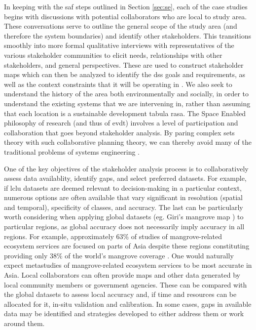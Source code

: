 \documentclass[notitlepage]{article}
\begin{document}
In keeping with the \ac{saf} steps outlined in Section \ref{sec:se}, each of the case studies begins with discussions with potential collaborators who are local to study area. These conversations serve to outline the general scope of the study area (and therefore the system boundaries) and identify other stakeholders. This transitions smoothly into more formal qualitative interviews with representatives of the various stakeholder communities to elicit needs, relationships with other stakeholders, and general perspectives. These are used to construct stakeholder maps which can then be analyzed to identify the \ac{dss} goals and requirements, as well as the context constraints that it will be operating in \cite{crawleySystemArchitectureStrategy2015, woodBuildingTechnologicalCapability2012}. We also seek to understand the history of the area both environmentally and socially, in order to understand the existing systems that we are intervening in, rather than assuming that each location is a sustainable development tabula rasa. The Space Enabled philosophy of research (and thus of \ac{evdt}) involves a level of participation and collaboration that goes beyond stakeholder analysis. By paring complex \ac{sets} theory with such collaborative planning theory, we can thereby avoid many of the traditional problems of systems engineering \cite{goodspeedScenarioPlanningCities2020}. 

\color{OliveGreen}

One of the key objectives of the stakeholder analysis process is to collaboratively assess data availablity, identify gaps, and select preferred datasets. For example, if \ac{lclu} datasets are deemed relevant to decision-making in a particular context, numerous options are often available that vary significant in resolution (spatial and temporal), specificity of classes, and accuracy. The last can be particularly worth considering when applying global datasets (eg. Giri's mangrove map \cite{giriStatusDistributionMangrove2011}) to particular regions, as global accuracy does not necessarily imply accuracy in all regions. For example, approximately 63\% of studies of mangrove-related ecosystem services are focused on parts of Asia despite these regions constituting providing only 38\% of the world’s mangrove coverage \cite{veghMangroveEcosystemServices2014}. One would naturally expect metastudies of mangrove-related ecosystem services to be most accurate in Asia. Local collaborators can often provide maps and other data generated by local community members or government agencies. These can be compared with the global datasets to assess local accuracy and, if time and resources can be allocated for it, in-situ validation and calibration. In some cases, gaps in available data may be identified and strategies developed to either address them or work around them. 
\end{document}
